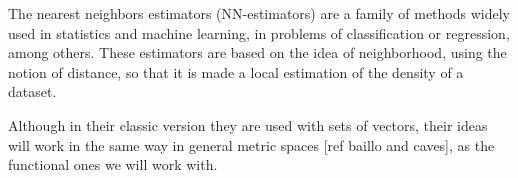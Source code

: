 The nearest neighbors estimators (NN-estimators) are a family of methods widely
used in statistics and machine learning, in problems of classification or
regression, among others. These estimators are based on the idea of
neighborhood, using the notion of distance, so that it is made a local
estimation of the density of a dataset.

Although in their classic version they are used with sets of vectors,
their ideas will work in the same way in general metric
spaces [ref baillo and caves], as the functional ones we will work with.
